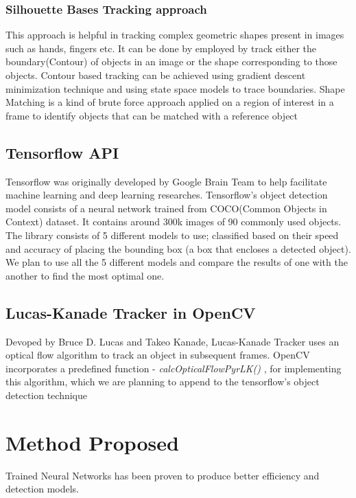 \documentclass[10pt,twocolumn,letterpaper]{article}
\begin{document}
\subsubsection{Silhouette Bases Tracking approach}
This approach is helpful in tracking complex geometric shapes present in images such as hands, fingers etc. It can be done by employed by track either the boundary(Contour) of objects in an image or the shape corresponding to those objects. Contour based tracking can be achieved using gradient descent minimization technique and using state space models to trace boundaries. Shape Matching is a kind of brute force approach applied on a region of interest in a frame to identify objects that can be matched with a reference object


\subsection{Tensorflow API}

Tensorflow was originally developed by Google Brain Team to help facilitate machine learning and deep learning researches. Tensorflow's object detection model consists of a neural network trained from COCO(Common Objects in Context) dataset. It contains around 300k images of 90 commonly used objects. The library consists of 5 different models to use; classified based on their speed and accuracy of placing the bounding box (a box that encloses a detected object). We plan to use all the 5 different models and compare the results of one with the another to find the most optimal one.

\subsection{Lucas-Kanade Tracker in OpenCV}

Devoped by Bruce D. Lucas and Takeo Kanade, Lucas-Kanade Tracker uses an optical flow algorithm to track an object in subsequent frames. OpenCV incorporates a predefined function - \textit{calcOpticalFlowPyrLK()} , for implementing this algorithm, which we are planning to append to the tensorflow's object detection technique


\section{Method Proposed}
Trained Neural Networks has been proven to produce better efficiency and detection models. 
\end{document}
